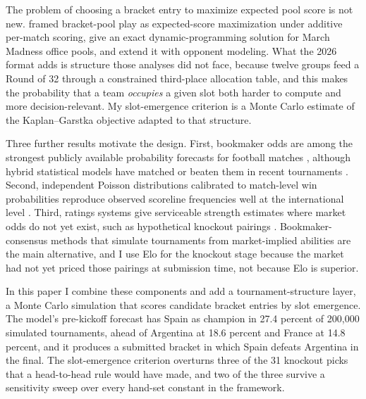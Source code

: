 \documentclass[11pt,letterpaper]{article}
\begin{document}
The problem of choosing a bracket entry to maximize expected pool score is not new. \citet{breiter1997} framed bracket-pool play as expected-score maximization under additive per-match scoring, \citet{kaplangarstka2001} give an exact dynamic-programming solution for March Madness office pools, and \citet{clairletscher2007} extend it with opponent modeling. What the 2026 format adds is structure those analyses did not face, because twelve groups feed a Round of 32 through a constrained third-place allocation table, and this makes the probability that a team \emph{occupies} a given slot both harder to compute and more decision-relevant. My slot-emergence criterion is a Monte Carlo estimate of the Kaplan--Garstka objective adapted to that structure.

Three further results motivate the design. First, bookmaker odds are among the strongest publicly available probability forecasts for football matches \citep{strumbelj2014, leitner2010}, although hybrid statistical models have matched or beaten them in recent tournaments \citep{groll2018, groll2019}. Second, independent Poisson distributions calibrated to match-level win probabilities reproduce observed scoreline frequencies well at the international level \citep{maher1982, dixoncoles1997}. Third, ratings systems give serviceable strength estimates where market odds do not yet exist, such as hypothetical knockout pairings \citep{hvattum2010, elo1978, constantinou2019}. Bookmaker-consensus methods that simulate tournaments from market-implied abilities \citep{zeileis2018} are the main alternative, and I use Elo for the knockout stage because the market had not yet priced those pairings at submission time, not because Elo is superior.

In this paper I combine these components and add a tournament-structure layer, a Monte Carlo simulation that scores candidate bracket entries by slot emergence. The model's pre-kickoff forecast has Spain as champion in 27.4 percent of 200{,}000 simulated tournaments, ahead of Argentina at 18.6 percent and France at 14.8 percent, and it produces a submitted bracket in which Spain defeats Argentina in the final.\liveAbstractRevision{} The slot-emergence criterion overturns three of the 31 knockout picks that a head-to-head rule would have made, and two of the three survive a sensitivity sweep over every hand-set constant in the framework.
\end{document}

